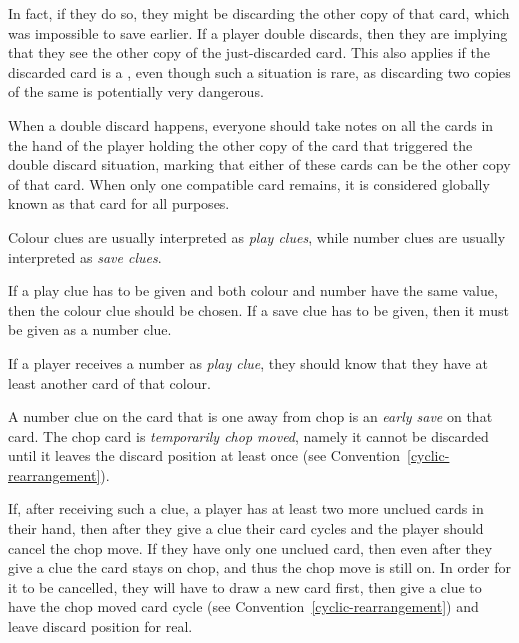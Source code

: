 In fact, if they do so, they might be discarding the other copy of that card, which was impossible to save earlier. If a player double discards, then they are implying that they see the other copy of the just-discarded card. This also applies if the discarded card is a , even though such a situation is rare, as discarding two copies of the same  is potentially very dangerous. %

\begin{convention}
	\label{discard-notes}
	When a double discard happens, everyone should take notes on all the cards in the hand of the player holding the other copy of the card that triggered the double discard situation, marking that either of these cards can be the other copy of that card. When only one compatible card remains, it is considered globally known as that card for all purposes.
\end{convention}

Colour clues are usually interpreted as \emph{play clues}, while number clues are usually interpreted as \emph{save clues}.

\begin{convention}
	If a play clue has to be given and both colour and number have the same value, then the colour clue should be chosen. If a save clue has to be given, then it must be given as a number clue.
\end{convention}

\begin{corollary}
	If a player receives a number as \emph{play clue}, they should know that they have at least another card of that colour.
\end{corollary}

\begin{convention}
	A number clue on the card that is one away from chop is an \emph{early save} on that card. The chop card is \emph{temporarily chop moved}, namely it cannot be discarded until it leaves the discard position at least once (see Convention~\ref{cyclic-rearrangement}).
\end{convention}

If, after receiving such a clue, a player has at least two more unclued cards in their hand, then after they give a clue their card cycles and the player should cancel the chop move. If they have only one unclued card, then even after they give a clue the card stays on chop, and thus the chop move is still on. In order for it to be cancelled, they will have to draw a new card first, then give a clue to have the chop moved card cycle (see Convention~\ref{cyclic-rearrangement}) and leave discard position for real.

